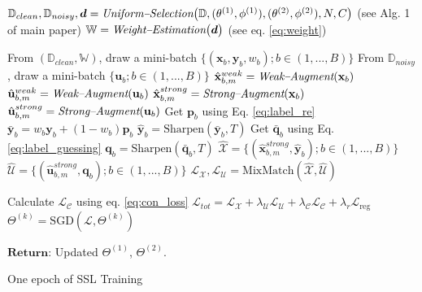 \documentclass[10pt,twocolumn,letterpaper]{article}
\begin{document}
\begin{algorithm*}[htb]
	{
        $\mathbb{D}_{clean}, \mathbb{D}_{noisy}, \boldsymbol{d} = \textit{Uniform\textendash Selection}\big(\mathbb{D}, (\theta^{(1)}, \phi^{(1)}), (\theta^{(2)}, \phi^{(2)}), N, C \big)$ (see Alg. 1 of main paper)  
        $\mathbb{W} = \textit{{Weight\textendash Estimation}}\big(\boldsymbol{d}\big) $ (see eq. \ref{eq:weight})  
		{
			From $(\mathbb{D}_{clean}, \mathbb{W})$, draw a mini-batch $\{(\mathbf{x}_b,\mathbf{y}_b, w_b);b\in(1,...,B)\}$ 
			From $\mathbb{D}_{noisy}$, draw a mini-batch $\{\mathbf{u}_b; b\in(1,...,B)\}$ 
			{        
                {
                    $\hat{\mathbf{x}}^{weak}_{b,m}=\textit{Weak\textendash Augment}(\mathbf{x}_b)$  $\hat{\mathbf{u}}^{weak}_{b,m}=\textit{Weak\textendash Augment}(\mathbf{u}_b)$  
        			$\hat{\mathbf{x}}^{strong}_{b,m}=\textit{Strong\textendash Augment}(\mathbf{x}_b)$ 
    				$\hat{\mathbf{u}}^{strong}_{b,m}=\textit{Strong\textendash Augment}(\mathbf{u}_b)$  
                }
				Get ${\mathbf{p}}_{b}$ using Eq. \ref{eq:label_re} 
				$\bar{\mathbf{y}}_b=w_b \mathbf{y}_b+(1-w_b){\mathbf{p}}_{b}$  
				$\hat{\mathbf{y}}_b=\mathrm{Sharpen}(\bar{\mathbf{y}}_b,T)$ 	 
				Get $\bar{\mathbf{q}}_{b}$ using Eq. \ref{eq:label_guessing}
				${\mathbf{q}}_{b}=\mathrm{Sharpen}(\bar{\mathbf{q}}_{b},T)$  
			}
			$\hat{\mathcal{X}}=\{(\hat{\mathbf{x}}^{strong}_{b,m},\hat{\mathbf{y}}_b);b\in(1,...,B)\}$  
			$\hat{\mathcal{U}}=\{(\hat{\mathbf{u}}^{strong}_{b,m},\mathbf{q}_{b});b\in(1,...,B)\}$  
	        $\mathcal{L}_\mathcal{X},\mathcal{L}_\mathcal{U}=\mathrm{MixMatch}(\hat{\mathcal{X}},\hat{\mathcal{U}})$  
	        
	        Calculate $\mathcal{L}_\mathcal{C}$ using eq. \ref{eq:con_loss}  
			$\mathcal{L}_{tot}=\mathcal{L}_\mathcal{X}+ \lambda_\mathcal{U} \mathcal{L}_\mathcal{U} + \lambda_\mathcal{C} \mathcal{L}_\mathcal{C} + \lambda_r \mathcal{L}_\mathrm{reg}$  
			$\Theta^{(k)}=\mathrm{SGD}(\mathcal{L},\Theta^{(k)})$ 
		}
	}
	$\textbf{Return:}$ Updated $\Theta^{(1)}$, $\Theta^{(2)}$.
	\caption{\small One epoch of SSL Training}
	\label{alg:SSL_training}
	
\end{algorithm*}
\end{document}
